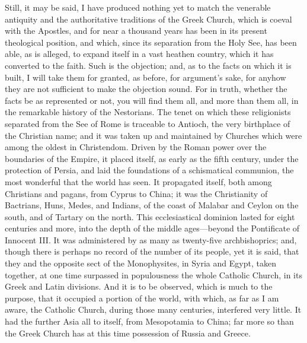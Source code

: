 Still, it may be said, I have produced nothing yet to match the
venerable antiquity and the authoritative traditions of the Greek
Church, which is coeval with the Apostles, and for near a thousand
years has been in its present theological position, and which, since
its separation from the Holy See, has been able, as is alleged, to
expand itself in a vast heathen country, which it has converted to the
faith. Such is the objection; and, as to the facts on which it is
built, I will take them for granted, as before, for argument's sake,
for anyhow they are not sufficient to make the objection sound. For in
truth, whether the facts be as represented or not, you will find them
all, and more than them all, in the remarkable history of the
Nestorians. The tenet on which these religionists separated from the
See of Rome is traceable to Antioch, the very birthplace of the
Christian name; and it was taken up and maintained by Churches which
were among the oldest in Christendom. Driven by the Roman power over
the boundaries of the Empire, it placed itself, as early as the fifth
century, under the protection of Persia, and laid the foundations of a
schismatical communion, the most wonderful that the world has seen. It
propagated itself, both among Christians and pagans, from Cyprus to
China; it was the Christianity of Bactrians, Huns, Medes, and Indians,
of the coast of Malabar and Ceylon on the south, and of Tartary on the
north. This ecclesiastical dominion lasted for eight centuries and
more, into the depth of the middle ages—beyond the Pontificate of
Innocent III. It was administered by as many as twenty-five
archbishoprics; and, though there is perhaps no record of the number
of its people, yet it is said, that they and the opposite sect of the
Monophysites, in Syria and Egypt, taken together, at one time
surpassed in populousness the whole Catholic Church, in its Greek and
Latin divisions. And it is to be observed, which is much to the
purpose, that it occupied a portion of the world, with which, as far
as I am aware, the Catholic Church, during those many centuries,
interfered very little. It had the further Asia all to itself, from
Mesopotamia to China; far more so than the Greek Church has at this
time possession of Russia and Greece.

